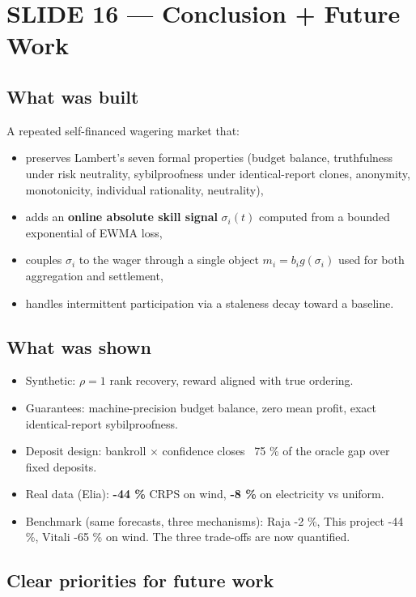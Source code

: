 \documentclass[11pt]{article}
\begin{document}
\section{SLIDE 16 --- Conclusion + Future Work}


\subsection{What was built}


A repeated self-financed wagering market that:

\begin{itemize}
\item preserves Lambert's seven formal properties (budget balance, truthfulness under risk neutrality, sybilproofness under identical-report clones, anonymity, monotonicity, individual rationality, neutrality),
\item adds an \textbf{online absolute skill signal} $\sigma_i(t)$ computed from a bounded exponential of EWMA loss,
\item couples $\sigma_i$ to the wager through a single object $m_i = b_i g(\sigma_i)$ used for both aggregation and settlement,
\item handles intermittent participation via a staleness decay toward a baseline.
\end{itemize}

\subsection{What was shown}


\begin{itemize}
\item Synthetic: $\rho = 1$ rank recovery, reward aligned with true ordering.
\item Guarantees: machine-precision budget balance, zero mean profit, exact identical-report sybilproofness.
\item Deposit design: bankroll $\times$ confidence closes ~75 \% of the oracle gap over fixed deposits.
\item Real data (Elia): \textbf{-44 \%} CRPS on wind, \textbf{-8 \%} on electricity vs uniform.
\item Benchmark (same forecasts, three mechanisms): Raja -2 \%, This project -44 \%, Vitali -65 \% on wind. The three trade-offs are now quantified.
\end{itemize}

\subsection{Clear priorities for future work}
\end{document}
